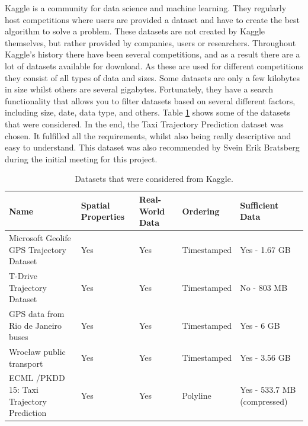 Kaggle is a community for data science and machine learning. They regularly host competitions where users are provided a dataset and have to create the best algorithm to solve a problem. These datasets are not created by Kaggle themselves, but rather provided by companies, users or researchers. Throughout Kaggle's history there have been several competitions, and as a result there are a lot of datasets available for download. As these are used for different competitions they consist of all types of data and sizes. Some datasets are only a few kilobytes in size whilst others are several gigabytes. Fortunately, they have a search functionality that allows you to filter datasets based on several different factors, including size, date, data type, and others. Table \ref{tab:datasets} shows some of the datasets that were considered. In the end, the Taxi Trajectory Prediction dataset was chosen. It fulfilled all the requirements, whilst also being really descriptive and easy to understand. This dataset was also recommended by Svein Erik Bratsberg during the initial meeting for this project.
\begin{table}
	\centering
	\label{tab:datasets}
	\caption{Datasets that were considered from Kaggle.}
	\begin{tabularx}{\textwidth}{|X|X|X|X|X|} \hline
		\multicolumn{1}{|X|}{\textbf{Name}} & \multicolumn{1}{X|}{\textbf{Spatial Properties}} & \multicolumn{1}{X|}{\textbf{Real-World Data}} & \multicolumn{1}{X|}{\textbf{Ordering}} & \multicolumn{1}{X|}{\textbf{Sufficient Data}} \\ \hline
		Microsoft Geolife GPS Trajectory Dataset & Yes & Yes & Timestamped & Yes - 1.67 GB \\ \hline
		T-Drive Trajectory Dataset & Yes & Yes & Timestamped & No - 803 MB \\ \hline
		GPS data from Rio de Janeiro buses & Yes & Yes & Timestamped & Yes - 6 GB \\ \hline
		Wrocław public transport & Yes & Yes & Timestamped & Yes - 3.56 GB \\ \hline
		ECML /PKDD 15: Taxi Trajectory Prediction & Yes & Yes & Polyline & Yes - 533.7 MB (compressed) \\ \hline
		
	\end{tabularx}
	
\end{table}


